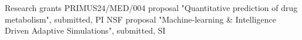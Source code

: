 \begin{rubric}{Research grants}
%
\entry*[\hspace{1.05cm}2023]%
  PRIMUS24/MED/004 proposal "Quantitative prediction of drug metabolism", submitted, PI
\entry*[2020]%
  NSF proposal "Machine-learning \& Intelligence Driven Adaptive Simulations", submitted, SI
\end{rubric}
